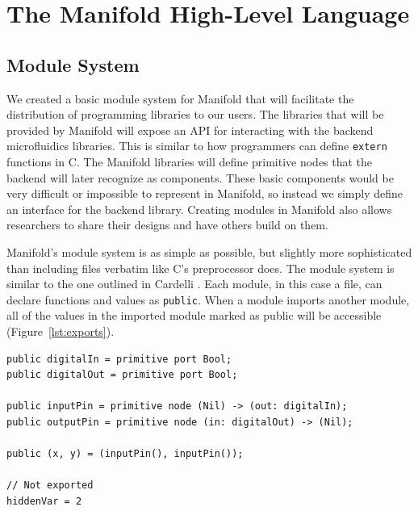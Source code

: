 \section{The Manifold High-Level Language}

\subsection{Module System}

We created a basic module system for Manifold that will facilitate the
distribution of programming libraries to our users. The libraries that will be
provided by Manifold will expose an API for interacting with the backend
microfluidics libraries. This is similar to how programmers can define
\texttt{extern} functions in C. The Manifold libraries will define primitive
nodes that the backend will later recognize as components. These basic
components would be very difficult or impossible to represent in Manifold, so
instead we simply define an interface for the backend library. Creating
modules in Manifold also allows researchers to share their designs and have
others build on them.

Manifold's module system is as simple as possible, but slightly more
sophisticated than including files verbatim like C's preprocessor does.
The module system is similar to the one outlined in Cardelli
\cite{Cardelli:1997:PFL:263699.263735}. Each module, in this case a file, can
declare functions and values as \texttt{public}. When a module imports another
module, all of the values in the imported module marked as public will be
accessible (Figure~\ref{lst:exports}).

\begin{lstlisting}[label=lst:exports, caption=Exported values in a Manifold file]
public digitalIn = primitive port Bool;
public digitalOut = primitive port Bool;

public inputPin = primitive node (Nil) -> (out: digitalIn);
public outputPin = primitive node (in: digitalOut) -> (Nil);

public (x, y) = (inputPin(), inputPin());

// Not exported
hiddenVar = 2
\end{lstlisting}

